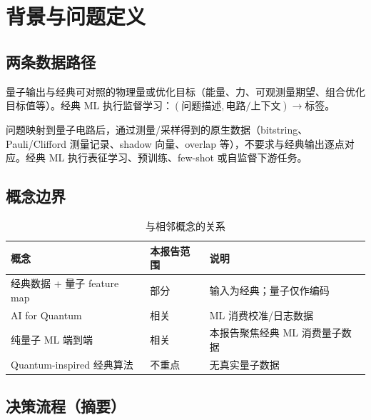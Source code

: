 \section{背景与问题定义}
\label{sec:background}

\subsection{两条数据路径}

\begin{description}[leftmargin=3cm,style=nextline]
  \item[\pathone{}] 量子输出与经典可对照的物理量或优化目标（能量、力、可观测量期望、组合优化目标值等）。经典 ML 执行监督学习：$(\text{问题描述}, \text{电路/上下文}) \rightarrow \text{标签}$。
  \item[\pathtwo{}] 问题映射到量子电路后，通过测量/采样得到的原生数据（bitstring、Pauli/Clifford 测量记录、shadow 向量、overlap 等），不要求与经典输出逐点对应。经典 ML 执行表征学习、预训练、few-shot 或自监督下游任务。
\end{description}

\subsection{概念边界}

\begin{table}[htbp]
  \centering
  \caption{与相邻概念的关系}
  \begin{tabular}{@{}llp{7cm}@{}}
    \toprule
    概念 & 本报告范围 & 说明 \\
    \midrule
    经典数据 + 量子 feature map & 部分 & 输入为经典；量子仅作编码 \\
    AI for Quantum & 相关 & ML 消费校准/日志数据 \\
    纯量子 ML 端到端 & 相关 & 本报告聚焦经典 ML 消费量子数据 \\
    Quantum-inspired 经典算法 & 不重点 & 无真实量子数据 \\
    \bottomrule
  \end{tabular}
\end{table}

\subsection{决策流程（摘要）}

